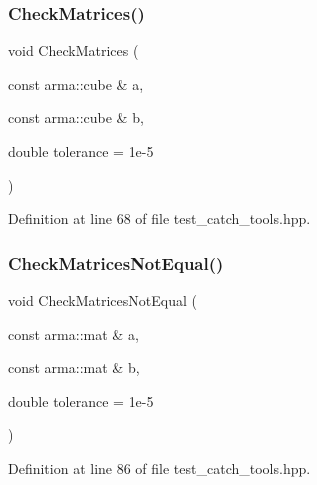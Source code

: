 \subsubsection{Check\+Matrices()\hspace{0.1cm}{\footnotesize\ttfamily [3/3]}}
{\footnotesize\ttfamily void Check\+Matrices (\begin{DoxyParamCaption}\item[{const arma\+::cube \&}]{a,  }\item[{const arma\+::cube \&}]{b,  }\item[{double}]{tolerance = {\ttfamily 1e-\/5} }\end{DoxyParamCaption})\hspace{0.3cm}{\ttfamily [inline]}}



Definition at line 68 of file test\+\_\+catch\+\_\+tools.\+hpp.

\mbox{\label{test__catch__tools_8hpp_ab286653ce1d929749c5595d969c9405d}} 
\subsubsection{Check\+Matrices\+Not\+Equal()\hspace{0.1cm}{\footnotesize\ttfamily [1/3]}}
{\footnotesize\ttfamily void Check\+Matrices\+Not\+Equal (\begin{DoxyParamCaption}\item[{const arma\+::mat \&}]{a,  }\item[{const arma\+::mat \&}]{b,  }\item[{double}]{tolerance = {\ttfamily 1e-\/5} }\end{DoxyParamCaption})\hspace{0.3cm}{\ttfamily [inline]}}



Definition at line 86 of file test\+\_\+catch\+\_\+tools.\+hpp.

\mbox{\label{test__catch__tools_8hpp_a91052523ffe67c0b11c6731ad14689e1}} 
